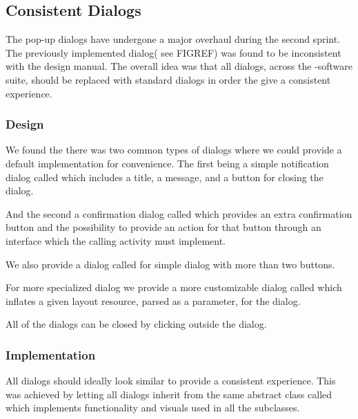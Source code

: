 \subsection{Consistent Dialogs}
\label{sec:consistent_dialogs}

The pop-up dialogs have undergone a major overhaul during the second sprint. The previously implemented dialog( see FIGREF) was found to be inconsistent with the \giraf design manual. The overall idea was that all dialogs, across the \giraf-software suite, should be replaced with standard dialogs in order the give a consistent experience. 

\subsubsection{Design}

We found the there was two common types of dialogs where we could provide a default implementation for convenience. The first being a simple notification dialog called  which includes a title, a message, and a button for closing the dialog. 


And the second a confirmation dialog called  which provides an extra confirmation button and the possibility to provide an action for that button through an interface which the calling activity must implement. 


We also provide a dialog called  for simple dialog with more than two buttons.

For more specialized dialog we provide a more customizable dialog called  which inflates a given layout resource, parsed as a parameter, for the dialog.

All of the dialogs can be closed by clicking outside the dialog.

\subsubsection{Implementation}

All dialogs should ideally look similar to provide a consistent experience. This was achieved by letting all dialogs inherit from the same abstract class called  which implements functionality and visuals used in all the subclasses.

